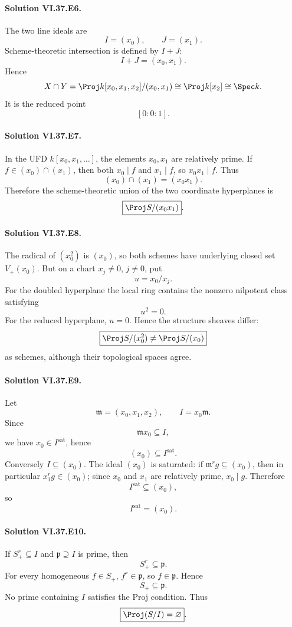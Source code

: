 \paragraph{Solution VI.37.E6.}
The two line ideals are
\[
I=(x_0),\qquad J=(x_1).
\]
Scheme-theoretic intersection is defined by \(I+J\):
\[
I+J=(x_0,x_1).
\]
Hence
\[
X\cap Y
=
\Proj k[x_0,x_1,x_2]/(x_0,x_1)
\cong
\Proj k[x_2]
\cong
\Spec k.
\]
It is the reduced point
\[
\boxed{[0:0:1]}.
\]

\paragraph{Solution VI.37.E7.}
In the UFD \(k[x_0,x_1,\ldots]\), the elements \(x_0,x_1\) are relatively prime. If \(f\in(x_0)\cap(x_1)\), then both \(x_0\mid f\) and \(x_1\mid f\), so \(x_0x_1\mid f\). Thus
\[
(x_0)\cap(x_1)=(x_0x_1).
\]
Therefore the scheme-theoretic union of the two coordinate hyperplanes is
\[
\boxed{\Proj S/(x_0x_1)}.
\]

\paragraph{Solution VI.37.E8.}
The radical of \((x_0^2)\) is \((x_0)\), so both schemes have underlying closed set \(V_+(x_0)\). But on a chart \(x_j\neq0\), \(j\neq0\), put
\[
u=x_0/x_j.
\]
For the doubled hyperplane the local ring contains the nonzero nilpotent class satisfying
\[
u^2=0.
\]
For the reduced hyperplane, \(u=0\). Hence the structure sheaves differ:
\[
\boxed{\Proj S/(x_0^2)\neq\Proj S/(x_0)}
\]
as schemes, although their topological spaces agree.

\paragraph{Solution VI.37.E9.}
Let
\[
\mathfrak m=(x_0,x_1,x_2),\qquad I=x_0\mathfrak m.
\]
Since
\[
\mathfrak m x_0\subseteq I,
\]
we have \(x_0\in I^{\mathrm{sat}}\), hence
\[
(x_0)\subseteq I^{\mathrm{sat}}.
\]
Conversely \(I\subseteq(x_0)\). The ideal \((x_0)\) is saturated: if \(\mathfrak m^r g\subseteq(x_0)\), then in particular \(x_1^r g\in(x_0)\); since \(x_0\) and \(x_1\) are relatively prime, \(x_0\mid g\). Therefore
\[
I^{\mathrm{sat}}\subseteq(x_0),
\]
so
\[
\boxed{I^{\mathrm{sat}}=(x_0)}.
\]

\paragraph{Solution VI.37.E10.}
If \(S_+^r\subseteq I\) and \(\mathfrak p\supseteq I\) is prime, then
\[
S_+^r\subseteq\mathfrak p.
\]
For every homogeneous \(f\in S_+\), \(f^r\in\mathfrak p\), so \(f\in\mathfrak p\). Hence
\[
S_+\subseteq\mathfrak p.
\]
No prime containing \(I\) satisfies the Proj condition. Thus
\[
\boxed{\Proj(S/I)=\varnothing}.
\]

